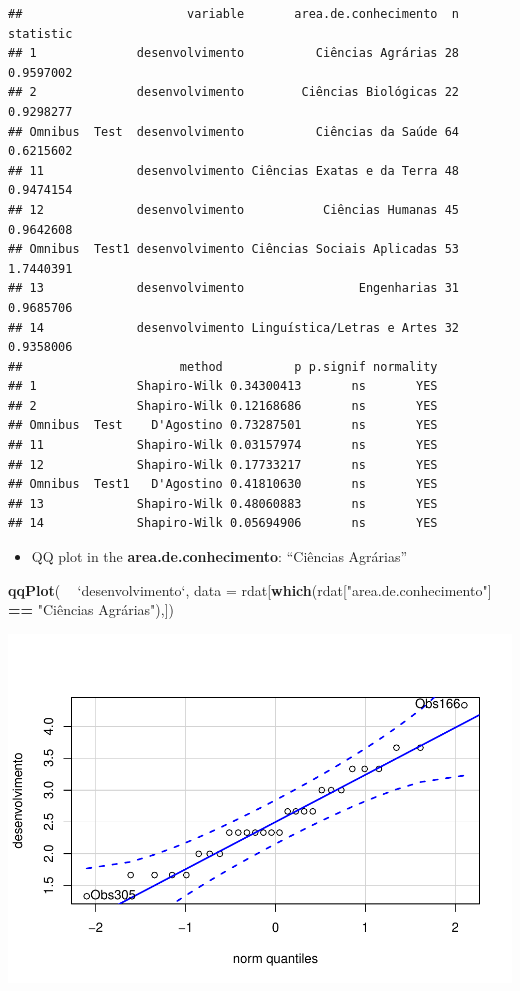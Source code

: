 \documentclass[]{article}
\newenvironment{Shaded}{\begin{snugshade}}{\end{snugshade}}
\newcommand{\DataTypeTok}[1]{\textcolor[rgb]{0.13,0.29,0.53}{#1}}
\newcommand{\KeywordTok}[1]{\textcolor[rgb]{0.13,0.29,0.53}{\textbf{#1}}}
\newcommand{\NormalTok}[1]{#1}
\newcommand{\OperatorTok}[1]{\textcolor[rgb]{0.81,0.36,0.00}{\textbf{#1}}}
\newcommand{\StringTok}[1]{\textcolor[rgb]{0.31,0.60,0.02}{#1}}
\providecommand{\tightlist}{%
  \setlength{\itemsep}{0pt}\setlength{\parskip}{0pt}}
\begin{document}
\begin{verbatim}
##                       variable       area.de.conhecimento  n statistic
## 1              desenvolvimento          Ciências Agrárias 28 0.9597002
## 2              desenvolvimento        Ciências Biológicas 22 0.9298277
## Omnibus  Test  desenvolvimento          Ciências da Saúde 64 0.6215602
## 11             desenvolvimento Ciências Exatas e da Terra 48 0.9474154
## 12             desenvolvimento           Ciências Humanas 45 0.9642608
## Omnibus  Test1 desenvolvimento Ciências Sociais Aplicadas 53 1.7440391
## 13             desenvolvimento                Engenharias 31 0.9685706
## 14             desenvolvimento Linguística/Letras e Artes 32 0.9358006
##                      method          p p.signif normality
## 1              Shapiro-Wilk 0.34300413       ns       YES
## 2              Shapiro-Wilk 0.12168686       ns       YES
## Omnibus  Test    D'Agostino 0.73287501       ns       YES
## 11             Shapiro-Wilk 0.03157974       ns       YES
## 12             Shapiro-Wilk 0.17733217       ns       YES
## Omnibus  Test1   D'Agostino 0.41810630       ns       YES
## 13             Shapiro-Wilk 0.48060883       ns       YES
## 14             Shapiro-Wilk 0.05694906       ns       YES
\end{verbatim}

\begin{itemize}
\tightlist
\item
  QQ plot in the \textbf{area.de.conhecimento}: ``Ciências Agrárias''
\end{itemize}

\begin{Shaded}
\begin{Highlighting}[]
\KeywordTok{qqPlot}\NormalTok{( }\OperatorTok{~}\StringTok{ `}\DataTypeTok{desenvolvimento}\StringTok{`}\NormalTok{, }\DataTypeTok{data =}\NormalTok{ rdat[}\KeywordTok{which}\NormalTok{(rdat[}\StringTok{"area.de.conhecimento"}\NormalTok{] }\OperatorTok{==}\StringTok{ "Ciências Agrárias"}\NormalTok{),])}
\end{Highlighting}
\end{Shaded}

\includegraphics{factorialAnova_files/figure-latex/unnamed-chunk-9-1.pdf}
\end{document}
